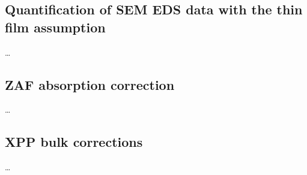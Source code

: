 

\subsection{Quantification of SEM EDS data with the thin film assumption}
\label{discussion:bulk_corrections:thin_film_assumption}

\dots



\subsection{ZAF absorption correction}
\label{discussion:bulk_corrections:zaf_absorption_correction}

\dots




\subsection{XPP bulk corrections}
\label{discussion:bulk_corrections:xpp}

\dots










